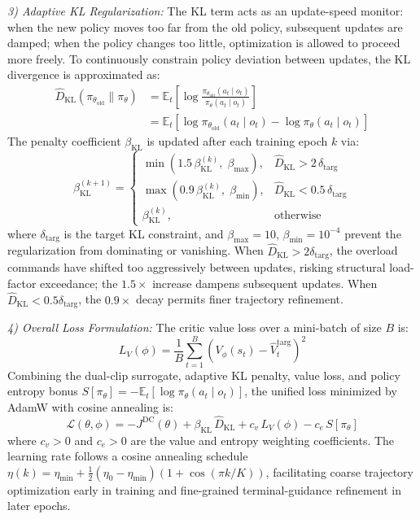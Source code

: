 \documentclass[lettersize,journal]{IEEEtran}
\begin{document}
\emph{3) Adaptive KL Regularization:} The KL term acts as an update-speed monitor: when the new policy moves too far from the old policy, subsequent updates are damped; when the policy changes too little, optimization is allowed to proceed more freely. To continuously constrain policy deviation between updates, the KL divergence is approximated as:
\begin{equation}
\label{eq:kl_approx}
\begin{split}
\hat{D}_{\mathrm{KL}}\!\left(\pi_{\theta_{\mathrm{old}}} \| \pi_\theta\right) &= \mathbb{E}_t\!\left[\log\frac{\pi_{\theta_{\mathrm{old}}}(a_t \mid o_t)}{\pi_\theta(a_t \mid o_t)}\right] \\
&= \mathbb{E}_t\!\left[\log\pi_{\theta_{\mathrm{old}}}(a_t \mid o_t) - \log\pi_\theta(a_t \mid o_t)\right]
\end{split}
\end{equation}
The penalty coefficient $\beta_{\mathrm{KL}}$ is updated after each training epoch $k$ via:
\begin{equation}
\label{eq:kl_adapt}
\beta_{\mathrm{KL}}^{(k+1)} =
\begin{cases}
\min\!\left(1.5\,\beta_{\mathrm{KL}}^{(k)},\; \beta_{\max}\right), & \hat{D}_{\mathrm{KL}} > 2\,\delta_{\mathrm{targ}} \\[6pt]
\max\!\left(0.9\,\beta_{\mathrm{KL}}^{(k)},\; \beta_{\min}\right), & \hat{D}_{\mathrm{KL}} < 0.5\,\delta_{\mathrm{targ}} \\[6pt]
\beta_{\mathrm{KL}}^{(k)}, & \text{otherwise}
\end{cases}
\end{equation}
where $\delta_{\mathrm{targ}}$ is the target KL constraint, and $\beta_{\max}=10$, $\beta_{\min}=10^{-4}$ prevent the regularization from dominating or vanishing. When $\hat{D}_{\mathrm{KL}} > 2\delta_{\mathrm{targ}}$, the overload commands have shifted too aggressively between updates, risking structural load-factor exceedance; the $1.5\times$ increase dampens subsequent updates. When $\hat{D}_{\mathrm{KL}} < 0.5\delta_{\mathrm{targ}}$, the $0.9\times$ decay permits finer trajectory refinement.

\emph{4) Overall Loss Formulation:} The critic value loss over a mini-batch of size $B$ is:
\begin{equation}
\label{eq:value_loss}
L_V(\phi) = \frac{1}{B}\sum_{t=1}^{B} \left(V_\phi(s_t) - \hat{V}_t^{\mathrm{targ}}\right)^2
\end{equation}
Combining the dual-clip surrogate, adaptive KL penalty, value loss, and policy entropy bonus $S[\pi_\theta] = -\mathbb{E}_t[\log\pi_\theta(a_t \mid o_t)]$, the unified loss minimized by AdamW with cosine annealing is:
\begin{equation}
\label{eq:total_loss}
\mathcal{L}(\theta,\phi) = - J^{\mathrm{DC}}(\theta) + \beta_{\mathrm{KL}}\,\hat{D}_{\mathrm{KL}} + c_v\,L_V(\phi) - c_e\,S[\pi_\theta]
\end{equation}
where $c_v > 0$ and $c_e > 0$ are the value and entropy weighting coefficients. The learning rate follows a cosine annealing schedule $\eta(k) = \eta_{\min} + \frac{1}{2}(\eta_0 - \eta_{\min})(1 + \cos(\pi k / K))$, facilitating coarse trajectory optimization early in training and fine-grained terminal-guidance refinement in later epochs.
\end{document}

